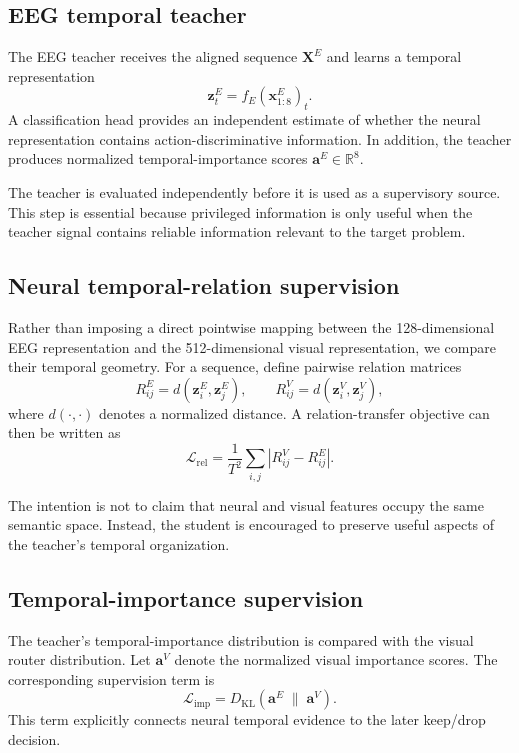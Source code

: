 \documentclass[runningheads]{llncs}
\begin{document}
\subsection{EEG temporal teacher}

The EEG teacher receives the aligned sequence $\mathbf{X}^{E}$ and learns a temporal representation
\begin{equation}
\mathbf{z}^{E}_{t}=f_{E}(\mathbf{x}^{E}_{1:8})_{t}.
\end{equation}
A classification head provides an independent estimate of whether the neural representation contains action-discriminative information. In addition, the teacher produces normalized temporal-importance scores $\mathbf{a}^{E}\in\mathbb{R}^{8}$.

The teacher is evaluated independently before it is used as a supervisory source. This step is essential because privileged information is only useful when the teacher signal contains reliable information relevant to the target problem.

\subsection{Neural temporal-relation supervision}

Rather than imposing a direct pointwise mapping between the 128-dimensional EEG representation and the 512-dimensional visual representation, we compare their temporal geometry. For a sequence, define pairwise relation matrices
\begin{equation}
R^{E}_{ij}=d(\mathbf{z}^{E}_{i},\mathbf{z}^{E}_{j}),
\qquad
R^{V}_{ij}=d(\mathbf{z}^{V}_{i},\mathbf{z}^{V}_{j}),
\end{equation}
where $d(\cdot,\cdot)$ denotes a normalized distance. A relation-transfer objective can then be written as
\begin{equation}
\mathcal{L}_{\mathrm{rel}}
=
\frac{1}{T^{2}}\sum_{i,j}
\left|R^{V}_{ij}-R^{E}_{ij}\right|.
\end{equation}

The intention is not to claim that neural and visual features occupy the same semantic space. Instead, the student is encouraged to preserve useful aspects of the teacher's temporal organization.

\subsection{Temporal-importance supervision}

The teacher's temporal-importance distribution is compared with the visual router distribution. Let $\mathbf{a}^{V}$ denote the normalized visual importance scores. The corresponding supervision term is
\begin{equation}
\mathcal{L}_{\mathrm{imp}}
=
D_{\mathrm{KL}}
\left(\mathbf{a}^{E}\;\|\;\mathbf{a}^{V}\right).
\end{equation}
This term explicitly connects neural temporal evidence to the later keep/drop decision.
\end{document}
